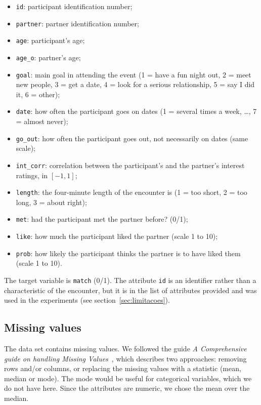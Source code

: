 \documentclass[12pt,a4paper]{article}
\newcommand{\code}[1]{\texttt{#1}}
\begin{document}
\begin{itemize}[noitemsep]
  \item \code{id}: participant identification number;
  \item \code{partner}: partner identification number;
  \item \code{age}: participant's age;
  \item \code{age\_o}: partner's age;
  \item \code{goal}: main goal in attending the event (1 = have a fun night out, 2 = meet new people, 3 = get a date, 4 = look for a serious relationship, 5 = say I did it, 6 = other);
  \item \code{date}: how often the participant goes on dates (1 = several times a week, \dots, 7 = almost never);
  \item \code{go\_out}: how often the participant goes out, not necessarily on dates (same scale);
  \item \code{int\_corr}: correlation between the participant's and the partner's interest ratings, in $[-1,1]$;
  \item \code{length}: the four-minute length of the encounter is (1 = too short, 2 = too long, 3 = about right);
  \item \code{met}: had the participant met the partner before? (0/1);
  \item \code{like}: how much the participant liked the partner (scale 1 to 10);
  \item \code{prob}: how likely the participant thinks the partner is to have liked them (scale 1 to 10).
\end{itemize}

The target variable is \code{match} (0/1). The attribute \code{id} is an identifier rather than a characteristic of the encounter, but it is in the list of attributes provided and was used in the experiments (see section~\ref{sec:limitacoes}).

\subsection{Missing values}

The data set contains missing values. We followed the guide \emph{A Comprehensive guide on handling Missing Values}~\cite{missing}, which describes two approaches: removing rows and/or columns, or replacing the missing values with a statistic (mean, median or mode). The mode would be useful for categorical variables, which we do not have here. Since the attributes are numeric, we chose the mean over the median.
\end{document}
